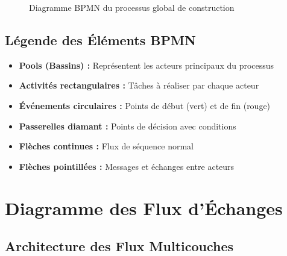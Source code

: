 \begin{figure}[H]
\caption{Diagramme BPMN du processus global de construction}
\label{fig:bpmn_construction}
\end{figure}

\subsection{Légende des Éléments BPMN}

\begin{itemize}
    \item \textbf{Pools (Bassins) :} Représentent les acteurs principaux du processus
    \item \textbf{Activités rectangulaires :} Tâches à réaliser par chaque acteur
    \item \textbf{Événements circulaires :} Points de début (vert) et de fin (rouge)
    \item \textbf{Passerelles diamant :} Points de décision avec conditions
    \item \textbf{Flèches continues :} Flux de séquence normal
    \item \textbf{Flèches pointillées :} Messages et échanges entre acteurs
\end{itemize}


\section{Diagramme des Flux d'Échanges}

\subsection{Architecture des Flux Multicouches}

